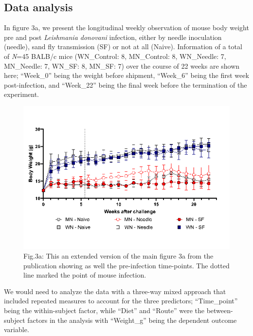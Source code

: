 \documentclass[
  12pt,
  letterpaper,
]{article}
\begin{document}
\subsection{Data analysis}\label{data-analysis-4}

In figure 3a, we present the longitudinal weekly observation of mouse body weight pre and post \emph{Leishmania donovani} infection, either by needle inoculation (needle), sand fly transmission (SF) or not at all (Naive). Information of a total of \emph{N}=45 BALB/c mice (WN\_Control: 8, MN\_Control: 8, WN\_Needle: 7, MN\_Needle: 7, WN\_SF: 8, MN\_SF: 7) over the course of 22 weeks are shown here; ``Week\_0'' being the weight before shipment, ``Week\_6'' being the first week post-infection, and ``Week\_22'' being the final week before the termination of the experiment.

\begin{figure}[H]

{\centering \includegraphics[width=0.9\linewidth,]{Statistics_Report_files/figure-latex/call-for-figure-3a-extended-1} 

}

\caption{Fig.3a: This an extended version of the main figure 3a from the publication showing as well the pre-infection time-points. The dotted line marked the point of mouse infection.}\label{fig:call-for-figure-3a-extended}
\end{figure}

We would need to analyze the data with a three-way mixed approach that included repeated measures to account for the three predictors; ``Time\_point'' being the within-subject factor, while ``Diet'' and ``Route'' were the between-subject factors in the analysis with ``Weight\_g'' being the dependent outcome variable.
\end{document}
